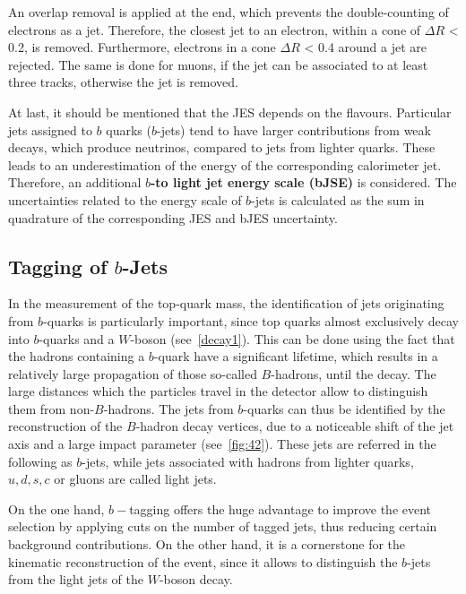     
 An overlap removal is applied at the end, which prevents the double-counting of electrons as a jet. Therefore, the closest jet to an electron, within a cone of $\Delta R $ < 0.2, is removed. Furthermore, electrons in a cone $\Delta R $ < 0.4 around a jet are rejected. The same is done for muons, if the jet can be associated to at least three tracks, otherwise the jet is removed.
 
 
 At last, it should be mentioned that the JES depends on the flavours. 
 Particular jets assigned to $b$ quarks ($b$-jets) tend to have larger contributions from weak decays, which produce neutrinos, compared to jets from lighter quarks. These leads to an underestimation of the energy of the corresponding calorimeter jet. Therefore, an additional \textbf{$b$-to light jet energy scale (bJSE)} is considered.  The uncertainties related to the energy scale of $b$-jets is calculated as the sum in quadrature of the corresponding JES and bJES uncertainty.   

 



\subsection{Tagging of $b$-Jets}
In the measurement of the top-quark mass, the identification of jets originating from $b$-quarks is particularly important, since  top quarks almost exclusively decay into $b$-quarks and a $W$-boson (see~\cref{decay1}). This can be done using the fact that the hadrons containing a $b$-quark have a significant  lifetime, which results in a relatively large propagation of those so-called $B$-hadrons, until the decay. The  large distances which the particles travel in the detector allow to distinguish them from non-$B$-hadrons.   
The  jets  from $b$-quarks can thus be identified by the reconstruction of the $B$-hadron decay vertices, due to a noticeable shift of the  jet axis and a large impact parameter (see~\cref{fig:42}). These jets are referred in the following as $b$-jets, while jets associated with hadrons from lighter quarks, $u, d, s, c$ or gluons are called light jets.

On the one hand, $b-$tagging offers the huge advantage to improve the event selection by applying cuts on the number of tagged jets, thus reducing certain background contributions. On the other hand, it is a cornerstone for the kinematic reconstruction of the event, since it allows to distinguish the $b$-jets from the light jets of the $W$-boson decay. 

